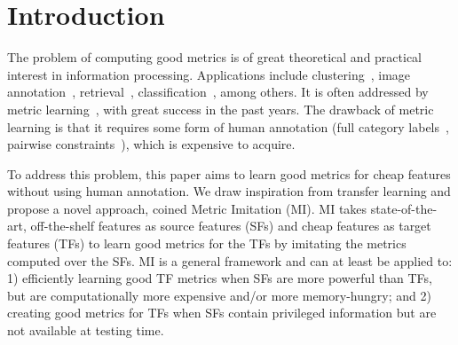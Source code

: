 \documentclass[10pt,twocolumn,letterpaper]{article}
\begin{document}


\section{Introduction}

The problem of computing good metrics is of great theoretical and
practical interest in information processing. Applications include
clustering~\cite{metric:nips03, metric:clustering:12}, image
annotation~\cite{tagprop:iccv09},
retrieval~\cite{local_distance:iccv:07, ml:fast:search:09},
classification~\cite{eigenface:pami97, local_distance:iccv:07,
  max:margin:knn}, among others.  It is often addressed by metric
learning~\cite{pairwise:metric:IJCAI09, large:scale:metric:cvpr12,
  tagprop:iccv09, max:margin:knn, qin:bmvc14}, with great success in
the past years. The drawback of metric learning is that it requires
some form of human annotation (\eg full category
labels~\cite{eigenface:pami97, local_distance:iccv:07, max:margin:knn,
  mlrank:10}, pairwise constraints~\cite{pairwise:metric:IJCAI09,
  ml:fast:search:09, large:scale:metric:cvpr12,
  fetlearn:convex:pami14}), which is expensive to acquire.

To address this problem, this paper aims to learn good metrics for cheap features without
using human annotation. We draw inspiration from transfer learning and
propose a novel approach, coined Metric Imitation (MI). 
MI takes state-of-the-art, off-the-shelf features as source features (SFs) and cheap features 
as target features (TFs) to learn good
metrics for the TFs by imitating the metrics computed
over the SFs. MI is a general framework and can at least
be applied to: 1) efficiently learning good TF metrics when
SFs are more powerful than TFs, but are computationally more expensive
and/or more memory-hungry; and 2) creating good metrics for TFs when SFs
contain privileged information but are not available at testing time. 
\end{document}
